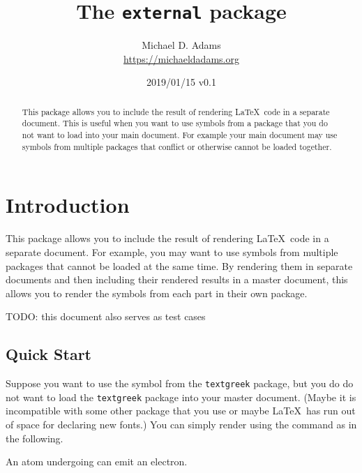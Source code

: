 \documentclass[10pt]{ltxdoc}
\newcommand{\pkg}[1]{\texttt{#1}}
\begin{document}
\title{The \pkg{external} package}
\author{Michael D. Adams\\\url{https://michaeldadams.org}}
\date{2019/01/15 v0.1}
\maketitle

\begin{abstract}
This package allows you to include the result of rendering \LaTeX\ code
in a separate document.
This is useful when you want to use symbols from a package that you do
not want to load into your main document.
For example your main document may use symbols from multiple packages
that conflict or otherwise cannot be loaded together.
\end{abstract}

\section{Introduction}
\label{sec:Introduction}

This package allows you to include the result of rendering \LaTeX\ code
in a separate document.
For example, you may want to use symbols from multiple packages that
cannot be loaded at the same time.
By rendering them in separate documents and then including their
rendered results in a master document, this allows you to render the
symbols from each part in their own package.

TODO: this document also serves as test cases

\subsection{Quick Start}
\label{subsec:Quick Start}

Suppose you want to use the  symbol from the
\pkg{textgreek} package, but you do do not want to load the
\pkg{textgreek} package into your master document.
(Maybe it is incompatible with some other package that you use or maybe
\LaTeX\ has run out of space for declaring new fonts.)
You can simply render  using the  command as
in the following.

\begin{tcblisting}{}
An atom undergoing
can emit an electron.
\end{tcblisting}
\end{document}
